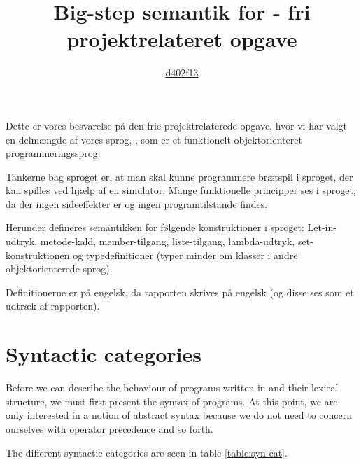 

\title{Big-step semantik for \junta{} - fri projektrelateret opgave}
\author{\href{mailto:d402f13@cs.aau.dk}{d402f13}}


\maketitle

Dette er vores besvarelse på den frie projektrelaterede opgave, hvor vi har valgt
en delmængde af vores sprog, \junta{}, som er et funktionelt objektorienteret
programmeringssprog.

Tankerne bag sproget er, at man skal kunne programmere brætspil i sproget,
der kan spilles ved hjælp af en simulator. Mange funktionelle principper
ses i sproget, da der ingen sideeffekter er og ingen programtilstande
findes.

Herunder defineres semantikken for følgende konstruktioner i
sproget: Let-in-udtryk, metode-kald, member-tilgang, liste-tilgang, lambda-udtryk,
set-konstruktionen og typedefinitioner (typer minder om klasser i andre
objektorienterede sprog).

\tableofcontents

Definitionerne er på engelsk, da rapporten skrives på engelsk (og disse
ses som et udtræk af rapporten).

\chapter{Syntactic categories}
Before we can describe the behaviour of programs written in \junta{} and
their lexical structure, we must first present the syntax of programs. At this
point, we are only interested in a notion of abstract syntax because we do not
need to concern ourselves with operator precedence and so forth.

The different syntactic categories are seen in table \ref{table:syn-cat}.

